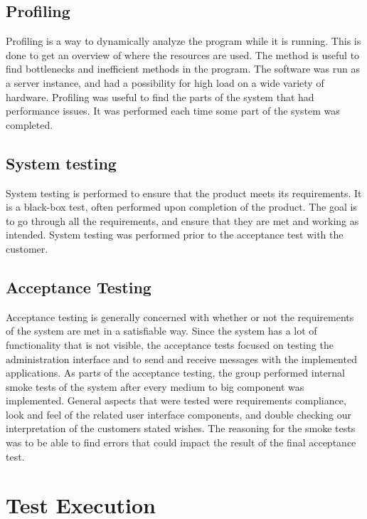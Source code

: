 \subsection{Profiling}
\label{subsec:testing-test_description-profiling}

Profiling is a way to dynamically analyze the program while it is running. This is done to get an overview of where the resources are used. The method is useful to find bottlenecks and inefficient methods in the program. The software was run as a server instance, and had a possibility for high load on a wide variety of hardware. Profiling was useful to find the parts of the system that had performance issues. It was performed each time some part of the system was completed.

\subsection{System testing}
\label{subsec:testing-test_description-system_testing}

System testing is performed to ensure that the product meets its requirements. It is a black-box test, often performed upon completion of the product. The goal is to go through all the requirements, and ensure that they are met and working as intended. System testing was performed prior to the acceptance test with the customer.

\subsection{Acceptance Testing}
\label{subsec:testing-test_description-acceptance_testing}
Acceptance testing is generally concerned with whether or not the requirements of the system are met in a satisfiable way. Since the system has a lot of functionality that is not visible, the acceptance tests focused on testing the administration interface and to send and receive messages with the implemented applications.
As parts of the acceptance testing, the group performed internal smoke tests of the system after every medium to big component was implemented. General aspects that were tested were requirements compliance, look and feel of the related user interface components, and double checking our interpretation of the customers stated wishes. The reasoning for the smoke tests was to be able to find errors that could impact the result of the final acceptance test.

\section{Test Execution}
\label{subsec:testing-test_execution}

